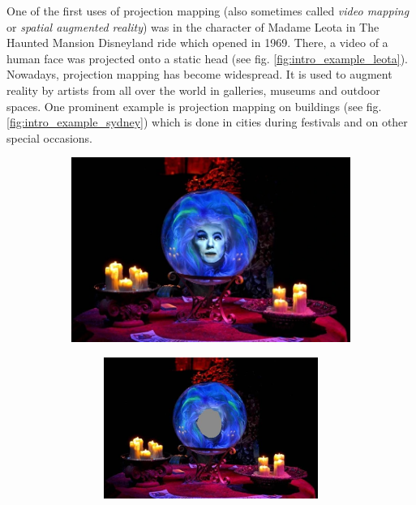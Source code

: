 One of the first uses of projection mapping (also sometimes called \textit{video mapping} or \textit{spatial augmented reality}) was in the character of Madame Leota in The Haunted Mansion Disneyland ride which opened in 1969. There, a video of a human face was projected onto a static head (see fig. \ref{fig:intro_example_leota}). Nowadays, projection mapping has become widespread. It is used to augment reality by artists from all over the world in galleries, museums and outdoor spaces. One prominent example is projection mapping on buildings (see fig. \ref{fig:intro_example_sydney}) which is done in cities during festivals and on other special occasions.

\begin{figure}[ht]
    \centering
    \begin{subfigure}{0.6\textwidth}
        \centering
        \includegraphics[width=\textwidth]{images/01-Leota.jpg}
        \caption{}
        \label{fig:intro_example_leota-full}
    \end{subfigure}
    \hfill
    \begin{subfigure}{0.39\textwidth}
        \centering
        \begin{subfigure}{\textwidth}
            \centering
            \includegraphics[width=\textwidth]{images/01-Leota-no_head.jpg}
            \caption{}
            \label{fig:intro_example_leota-scene}
        \end{subfigure}
        

\end{subfigure}
\end{figure}
